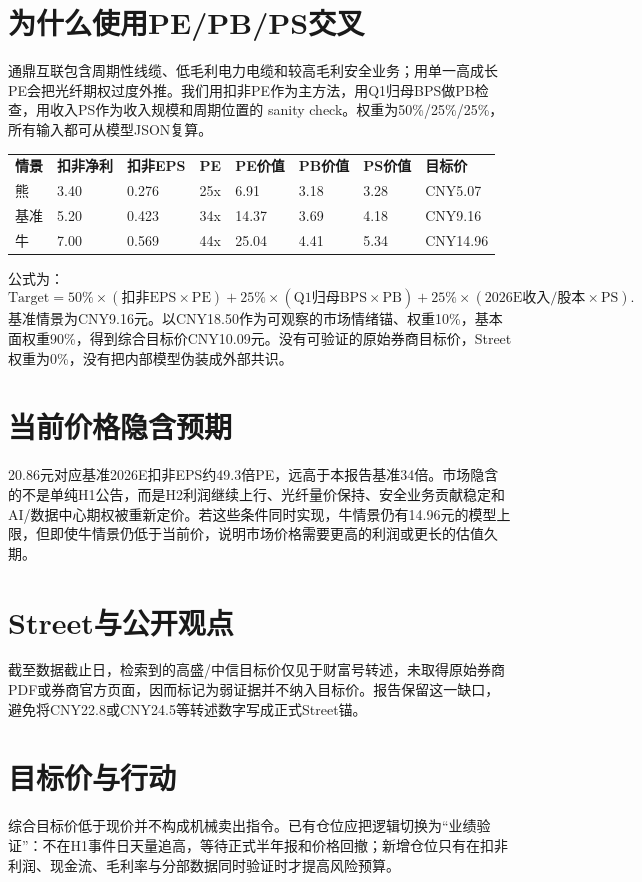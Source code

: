 \section{为什么使用PE/PB/PS交叉}
通鼎互联包含周期性线缆、低毛利电力电缆和较高毛利安全业务；用单一高成长PE会把光纤期权过度外推。我们用扣非PE作为主方法，用Q1归母BPS做PB检查，用收入PS作为收入规模和周期位置的 sanity check。权重为50\%/25\%/25\%，所有输入都可从模型JSON复算。

\begin{exhibitbox}
\begin{tabularx}{\exhibitboxwidth}{L{1.2cm}R{1.5cm}R{1.5cm}R{1.5cm}R{1.4cm}R{1.4cm}R{1.4cm}X}
\textbf{情景} & \textbf{扣非净利} & \textbf{扣非EPS} & \textbf{PE} & \textbf{PE价值} & \textbf{PB价值} & \textbf{PS价值} & \textbf{目标价} \\
熊 & 3.40 & 0.276 & 25x & 6.91 & 3.18 & 3.28 & CNY5.07 \\
基准 & 5.20 & 0.423 & 34x & 14.37 & 3.69 & 4.18 & CNY9.16 \\
牛 & 7.00 & 0.569 & 44x & 25.04 & 4.41 & 5.34 & CNY14.96 \\
\end{tabularx}
\end{exhibitbox}

公式为：
\[
\mathrm{Target}=50\%\times(\mathrm{扣非EPS}\times\mathrm{PE})+25\%\times(\mathrm{Q1归母BPS}\times\mathrm{PB})+25\%\times(\mathrm{2026E收入}/\mathrm{股本}\times\mathrm{PS}).
\]
基准情景为CNY9.16元。以CNY18.50作为可观察的市场情绪锚、权重10\%，基本面权重90\%，得到综合目标价CNY10.09元。没有可验证的原始券商目标价，Street权重为0\%，没有把内部模型伪装成外部共识。

\section{当前价格隐含预期}
20.86元对应基准2026E扣非EPS约49.3倍PE，远高于本报告基准34倍。市场隐含的不是单纯H1公告，而是H2利润继续上行、光纤量价保持、安全业务贡献稳定和AI/数据中心期权被重新定价。若这些条件同时实现，牛情景仍有14.96元的模型上限，但即使牛情景仍低于当前价，说明市场价格需要更高的利润或更长的估值久期。

\section{Street与公开观点}
截至数据截止日，检索到的高盛/中信目标价仅见于财富号转述，未取得原始券商PDF或券商官方页面，因而标记为弱证据并不纳入目标价。报告保留这一缺口，避免将CNY22.8或CNY24.5等转述数字写成正式Street锚。

\section{目标价与行动}
综合目标价低于现价并不构成机械卖出指令。已有仓位应把逻辑切换为“业绩验证”：不在H1事件日天量追高，等待正式半年报和价格回撤；新增仓位只有在扣非利润、现金流、毛利率与分部数据同时验证时才提高风险预算。
